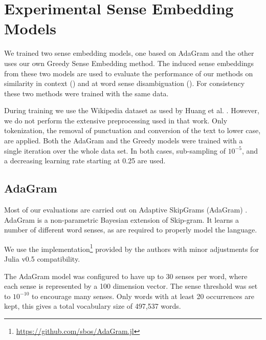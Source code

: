 \documentclass{llncs}
\def\parencite{\cite}
\begin{document}
\section{Experimental Sense Embedding Models} 
\label{Models}
We trained two sense embedding models, one based on AdaGram \parencite{AdaGrams} 
and the other uses our own Greedy Sense Embedding method. 
The induced sense embeddings from these two models are used to evaluate the performance of our methods on similarity in context () and at word sense disambiguation ().
For consistency these two methods were trained with the same data.

During training we use the Wikipedia dataset as used by Huang et al. \parencite{Huang2012}.
However, we do not perform the extensive preprocessing used in that work.
Only tokenization, the removal of punctuation and conversion of the text to lower case, are applied.
Both the AdaGram and the Greedy models were trained with a single iteration over the whole data set.
In both cases, sub-sampling of $10^{-5}$, and a decreasing learning rate starting at 0.25 are used.

\subsection{AdaGram}
Most of our evaluations are carried out on Adaptive SkipGrams (AdaGram) \parencite{AdaGrams}.
AdaGram is a non-parametric Bayesian extension of Skip-gram. It learns a number of different word senses, as are required to properly model the language.

We use the implementation\footnote{\url{https://github.com/sbos/AdaGram.jl}} provided by the authors with minor adjustments for Julia \parencite{Julia} v0.5 compatibility.


The AdaGram model was configured to have up to 30 senses per word, where each sense is represented by a 100 dimension vector. 
The sense threshold was set to $10^{-10}$ to encourage many senses.
Only words with at least 20 occurrences are kept, this gives a total vocabulary size of 497,537 words.


\end{document}
